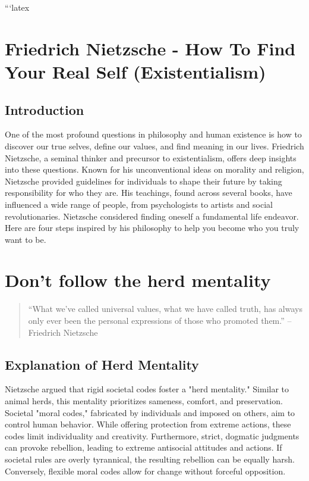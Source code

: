 ```latex

\sloppy

\section*{Friedrich Nietzsche - How To Find Your Real Self (Existentialism)}

\subsection*{Introduction}

One of the most profound questions in philosophy and human existence is how to discover our true selves, define our values, and find meaning in our lives. Friedrich Nietzsche, a seminal thinker and precursor to existentialism, offers deep insights into these questions. Known for his unconventional ideas on morality and religion, Nietzsche provided guidelines for individuals to shape their future by taking responsibility for who they are. His teachings, found across several books, have influenced a wide range of people, from psychologists to artists and social revolutionaries. Nietzsche considered finding oneself a fundamental life endeavor. Here are four steps inspired by his philosophy to help you become who you truly want to be.

\section{Don’t follow the herd mentality}

\begin{quote}
    “What we’ve called universal values, what we have called truth, has always only ever been the personal expressions of those who promoted them.” -- Friedrich Nietzsche
\end{quote}

\subsection*{Explanation of Herd Mentality}
Nietzsche argued that rigid societal codes foster a "herd mentality." Similar to animal herds, this mentality prioritizes sameness, comfort, and preservation. Societal "moral codes," fabricated by individuals and imposed on others, aim to control human behavior. While offering protection from extreme actions, these codes limit individuality and creativity. Furthermore, strict, dogmatic judgments can provoke rebellion, leading to extreme antisocial attitudes and actions. If societal rules are overly tyrannical, the resulting rebellion can be equally harsh. Conversely, flexible moral codes allow for change without forceful opposition.


